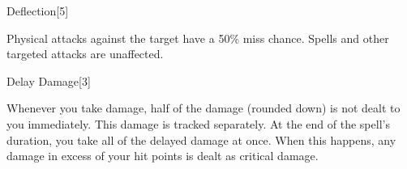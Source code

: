 \begin{spellsection}{Deflection}[5]
    \begin{spellheader}
    \end{spellheader}
    \begin{spellcontent}
        \begin{spelltargetinginfo}
        \end{spelltargetinginfo}
        \begin{spelleffects}
            \spelleffect Physical attacks against the target have a 50\% miss chance.
            Spells and other targeted attacks are unaffected.
            \spelldur \durshort
        \end{spelleffects}
    \end{spellcontent}
    \begin{spellfooter}
        \miscastexplode
    \end{spellfooter}
\end{spellsection}

\begin{spellsection}{Delay Damage}[3]
    \begin{spellheader}
    \end{spellheader}
    \begin{spellcontent}
        \begin{spelltargetinginfo}
        \end{spelltargetinginfo}
        \begin{spelleffects}
            \spelleffect Whenever you take damage, half of the damage (rounded down) is not dealt to you immediately. This damage is tracked separately. At the end of the spell's duration, you take all of the delayed damage at once. When this happens, any damage in excess of your hit points is dealt as critical damage.
            \spelldur \durmed
        \end{spelleffects}
        \begin{spellfooter}
            \miscastexplode
        \end{spellfooter}
    \end{spellcontent}
\end{spellsection}


